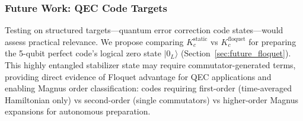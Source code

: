 \subsubsection{Future Work: QEC Code Targets}

Testing on structured targets—quantum error correction code states—would assess practical relevance. We propose comparing $K_c^{\text{static}}$ vs $K_c^{\text{floquet}}$ for preparing the 5-qubit perfect code's logical zero state $|0_L\rangle$ (Section~\ref{sec:future_floquet}). This highly entangled stabilizer state may require commutator-generated terms, providing direct evidence of Floquet advantage for QEC applications and enabling Magnus order classification: codes requiring first-order (time-averaged Hamiltonian only) vs second-order (single commutators) vs higher-order Magnus expansions for autonomous preparation.
